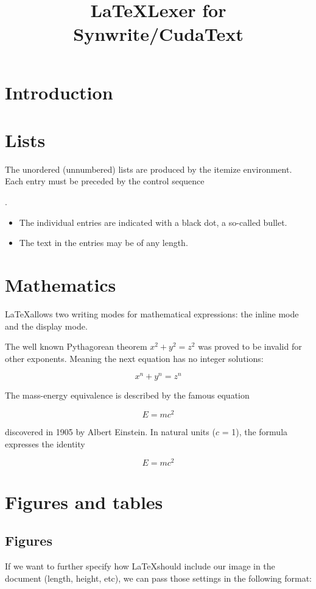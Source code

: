 \documentclass[12pt, letterpaper, twoside]{article}
\title{\LaTeX Lexer for Synwrite/CudaText}
\begin{document}
\maketitle

\section*{Introduction}

\section{Lists}

The unordered (unnumbered) lists are produced by the itemize environment. Each entry must be preceded by the control sequence \string\item.

\begin{itemize}
  \item The individual entries are indicated with a black dot, a so-called bullet.
  \item The text in the entries may be of any length.
\end{itemize}

\section{Mathematics}

\LaTeX allows two writing modes for mathematical expressions: the inline mode and the display mode. 

The well known Pythagorean theorem \(x^2 + y^2 = z^2\) was 
proved to be invalid for other exponents. 
Meaning the next equation has no integer solutions:
 
\[ x^n + y^n = z^n \]

The mass-energy equivalence is described by the famous equation
 
$$E=mc^2$$
 
discovered in 1905 by Albert Einstein. 
In natural units ($c$ = 1), the formula expresses the identity
 
\begin{equation}\label{key}
	E=mc^2
\end{equation}

\section{Figures and tables}

\subsection{Figures}
If we want to further specify how \LaTeX should include our image in the document (length, height, etc), we can pass those settings in the following format:
 
\end{document}
